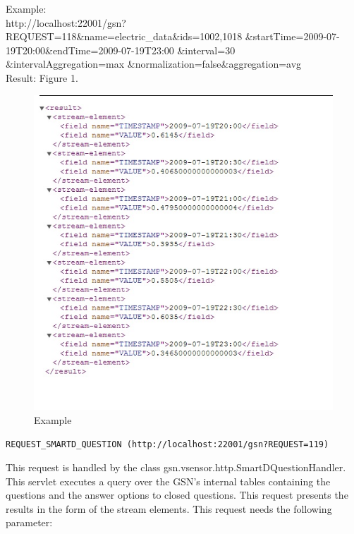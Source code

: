 \documentclass[12pt]{article}
\begin{document}
Example:  \\
  
http://localhost:22001/gsn?REQUEST=118\&name=electric\_data\&ids=1002,1018
\&startTime=2009-07-19T20:00\&endTime=2009-07-19T23:00
\&interval=30 \\ \&intervalAggregation=max
\&normalization=false\&aggregation=avg\\

Result: Figure 1.

\begin{figure}[ht!]
		\centering
			\includegraphics{REQUEST_SMARTD.JPG}
		\caption{Example}
\end{figure}

\vspace{1cm}

\texttt{REQUEST\_SMARTD\_QUESTION (http://localhost:22001/gsn?REQUEST=119)}

\vspace{0.5cm}

This request is handled by the class gsn.vsensor.http.SmartDQuestionHandler. This servlet executes a query over the GSN's internal tables containing the questions and the answer options to closed questions. This request presents the results in the form of the stream elements. This request needs the following parameter: 
\end{document}
